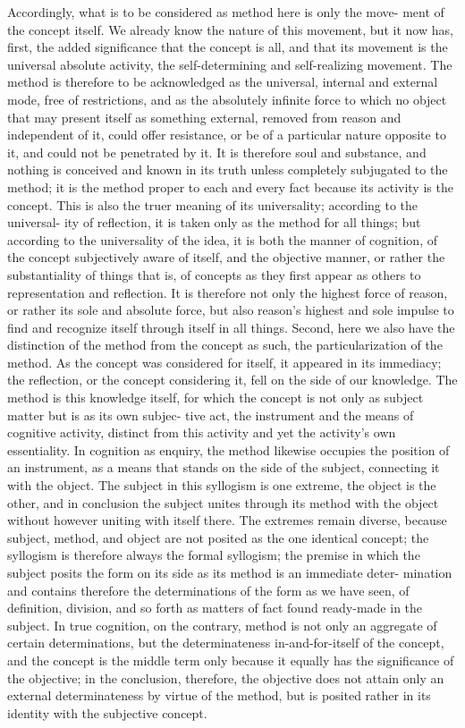 Accordingly, what is to be considered as method here is only the move-
ment of the concept itself. We already know the nature of this movement,
but it now has, first, the added significance that the concept is all, and
that its movement is the universal absolute activity, the self-determining
and self-realizing movement. The method is therefore to be acknowledged
as the universal, internal and external mode, free of restrictions, and as
the absolutely infinite force to which no object that may present itself as
something external, removed from reason and independent of it, could
offer resistance, or be of a particular nature opposite to it, and could not be
penetrated by it. It is therefore soul and substance, and nothing is conceived
and known in its truth unless completely subjugated to the method; it is the
method proper to each and every fact because its activity is the concept.
This is also the truer meaning of its universality; according to the universal-
ity of reflection, it is taken only as the method for all things; but according
to the universality of the idea, it is both the manner of cognition, of the
concept subjectively aware of itself, and the objective manner, or rather the
substantiality of things
 that is, of concepts as they first appear as others
to representation and reflection. It is therefore not only the highest force of
reason, or rather its sole and absolute force, but also reason's highest and
sole impulse to find and recognize itself through itself in all things.
 Second,
here we also have the distinction of the method from the concept as such, the
particularization of the method. As the concept was considered for itself,
it appeared in its immediacy; the reflection, or the concept considering it,
fell on the side of our knowledge. The method is this knowledge itself, for
which the concept is not only as subject matter but is as its own subjec-
tive act, the instrument and the means of cognitive activity, distinct from
this activity and yet the activity's own essentiality. In cognition as enquiry,
the method likewise occupies the position of an instrument, as a means
that stands on the side of the subject, connecting it with the object. The
subject in this syllogism is one extreme, the object is the other, and in
conclusion the subject unites through its method with the object without
however uniting with itself there. The extremes remain diverse, because
subject, method, and object are not posited as the one identical concept; the
syllogism is therefore always the formal syllogism; the premise in which
the subject posits the form on its side as its method is an immediate deter-
mination and contains therefore the determinations of the form
 as we
have seen, of definition, division, and so forth
 as matters of fact found
ready-made in the subject. In true cognition, on the contrary, method is
not only an aggregate of certain determinations, but the determinateness
in-and-for-itself of the concept, and the concept is the middle term only
because it equally has the significance of the objective; in the conclusion,
therefore, the objective does not attain only an external determinateness by
virtue of the method, but is posited rather in its identity with the subjective
concept.

